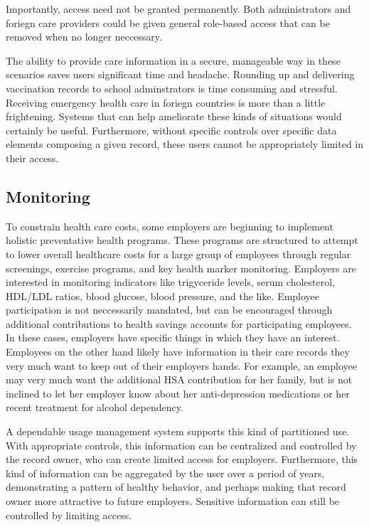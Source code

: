 \documentclass[10pt, conference, compsocconf]{IEEEtran}
\begin{document}
Importantly, access need not be granted permanently.  Both administrators and foriegn care providers could be given general role-based access that can be removed when no longer neccessary.

The ability to provide care information in a secure, manageable way in these scenarios saves users significant time and headache.  Rounding up and delivering vaccination records to school adminstrators is time consuming and stressful.  Receiving emergency health care in foriegn countries is more than a little frightening.  Systems that can help ameliorate these kinds of situations would certainly be useful.  Furthermore, without specific controls over specific data elements composing a given record, these users cannot be appropriately limited in their access.

\subsection{Monitoring}
To constrain health care costs, some employers are beginning to implement holistic preventative health programs.  These programs are structured to attempt to lower overall healthcare costs for a large group of employees through regular screenings, exercise programs, and key health marker monitoring.  Employers are interested in monitoring indicators like trigyceride levels, serum cholesterol, HDL/LDL ratios, blood glucose, blood pressure, and the like.  Employee participation is not neccessarily mandated, but can be encouraged through additional contributions to health savings accounts for participating employees.  In these cases, employers have specific things in which they have an interest. Employees on the other hand likely have information in their care records they very much want to keep out of their employers hands.  For example, an employee may very much want the additional HSA contribution for her family, but is not inclined to let her employer know about her anti-depression medications or her recent treatment for alcohol dependency.

A dependable usage management system supports this kind of partitioned use.  With appropriate controls, this information can be centralized and controlled by the record owner, who can create limited access for employers.  Furthermore, this kind of information can be aggregated by the user over a period of years, demonstrating a pattern of healthy behavior, and perhaps making that record owner more attractive to future employers.  Sensitive information can still be controlled by limiting access.
\end{document}

